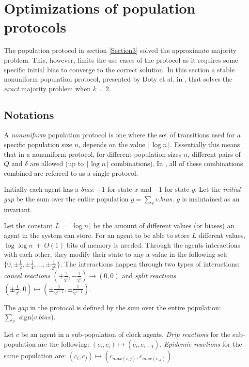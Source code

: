 \section{Optimizations of population protocols}
The population protocol in section \ref{Section3} solved the approximate majority problem. This, however, limits the use cases of the protocol as it requires some specific initial bias to converge to the correct solution.  In this section a stable nonuniform population protocol, presented by Doty et al. in \cite{dotyTimeSpaceOptimal2022}, that solves the \emph{exact} majority problem when $k = 2$. 

\subsection{Notations}

A \emph{nonuniform} population protocol is one where the set of transitions used for a specific population size $n$, depends on the value $\lceil \log n \rceil$. Essentially this means that in a nonuniform protocol, for different population sizes $n$, different pairs of $Q$ and $\delta$ are allowed (up to $\lceil \log n \rceil$ combinations). In \cite{dotyTimeSpaceOptimal2022}, all of these combinations combined are referred to as a single protocol. 

Initially each agent has a \emph{bias}: $+1$ for state $x$ and $-1$ for state $y$. Let the \emph{initial gap} be the sum over the entire population $g = \sum_v v.bias$. $g$ is maintained as an invariant. 

Let the constant $L = \lceil \log n \rceil$ be the amount of different values (or biases) an agent in the system can store. For an agent to be able to store $L$ different values, $\log \log n \ + \ O(1)$ bits of memory is needed. Through the agents interactions with each other, they modify their state to any a value in the following set: $\{ 0, \pm \frac{1}{2}, \pm \frac{1}{4}, ...,  \pm \frac{1}{2^L} \}$. The interactions happen through two types of interactions: \emph{cancel reactions} $(+\frac{1}{2^i}, -\frac{1}{2^i}) \mapsto (0, 0)$ and \emph{split reactions} $(\pm \frac{1}{2^i}, 0) \mapsto (\pm \frac{1}{2^{i + 1}}, \pm \frac{1}{2^{i + 1}})$.

The \emph{gap} in the protocol is defined by the sum over the entire population: \\ \mbox{$\sum_v$ sign($v.bias$)}.

Let $c$ be an agent in a sub-population of clock agents. \emph{Drip reactions} for the sub-population are the following: $(c_i, c_i) \mapsto (c_i, c_{i + 1})$. \emph{Epidemic reactions} for the same population are: $(c_i, c_j) \mapsto (c_{max(i, j)}, c_{max(i, j)})$.

